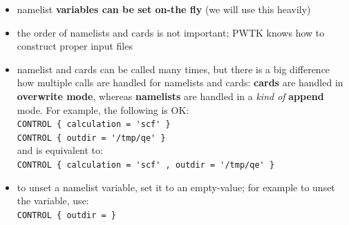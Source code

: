 \documentclass[landscape]{foils}
\begin{document}
\begin{itemize}
  \vspace{-0.5em}
\item namelist {\bf variables can be set on-the fly} (we will use this
  heavily)

  \vspace{-0.5em}
\item the order of namelists and cards is not important; PWTK knows
  how to construct proper input files

  \vspace{-0.5em}
\item namelist and cards can be called many times, but there is a big
  difference how multiple calls are handled for namelists and cards:
  {\bf cards} are handled in {\bf overwrite mode}, whereas {\bf
    namelists} are handled in a {\it kind of} {\bf
    append} mode. For example, the following is OK:\\[0.5em]
  {\codecolor\verb+CONTROL { calculation = 'scf' }+}\\
  {\codecolor\verb+CONTROL { outdir = '/tmp/qe' }+}\\[0.5em]
  and is equivalent to:\\[0.5em]
  {\codecolor\verb+CONTROL { calculation = 'scf' , outdir = '/tmp/qe' }+}

  \vspace{-0.5em}
\item to unset a namelist variable, set it to an empty-value; for example
  to unset the  variable, use:\\[0.5em]
  {\codecolor\verb+CONTROL { outdir = }+}


\end{itemize}
\end{document}
